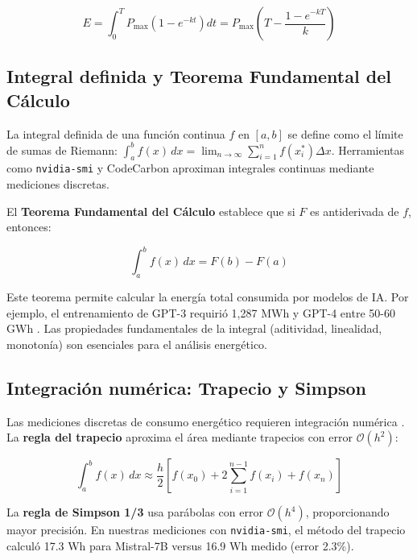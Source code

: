 \begin{equation}
E = \int_0^T P_{\text{max}} \left(1 - e^{-kt}\right) dt = P_{\text{max}} \left(T - \frac{1 - e^{-kT}}{k}\right)
\end{equation}

\subsection{Integral definida y Teorema Fundamental del Cálculo}

La integral definida de una función continua $f$ en $[a, b]$ se define como el límite de sumas de Riemann: $\int_a^b f(x) \, dx = \lim_{n \to \infty} \sum_{i=1}^n f(x_i^*) \Delta x$. Herramientas como \texttt{nvidia-smi} y CodeCarbon \cite{luccioni2025ai} aproximan integrales continuas mediante mediciones discretas.

El \textbf{Teorema Fundamental del Cálculo} establece que si $F$ es antiderivada de $f$, entonces:

\begin{equation}
\int_a^b f(x) \, dx = F(b) - F(a)
\end{equation}

Este teorema permite calcular la energía total consumida por modelos de IA. Por ejemplo, el entrenamiento de GPT-3 requirió 1,287 MWh \cite{tabbakh2024sustainable} y GPT-4 entre 50-60 GWh \cite{chatterjee2025energy}. Las propiedades fundamentales de la integral (aditividad, linealidad, monotonía) son esenciales para el análisis energético.

\subsection{Integración numérica: Trapecio y Simpson}

Las mediciones discretas de consumo energético requieren integración numérica \cite{greensoftware2025position, schwartz2019green}. La \textbf{regla del trapecio} aproxima el área mediante trapecios con error $\mathcal{O}(h^2)$:

\begin{equation}
\int_a^b f(x) \, dx \approx \frac{h}{2} \left[f(x_0) + 2\sum_{i=1}^{n-1} f(x_i) + f(x_n)\right]
\end{equation}

La \textbf{regla de Simpson 1/3} usa parábolas con error $\mathcal{O}(h^4)$, proporcionando mayor precisión. En nuestras mediciones con \texttt{nvidia-smi}, el método del trapecio calculó 17.3 Wh para Mistral-7B versus 16.9 Wh medido (error 2.3\%).

